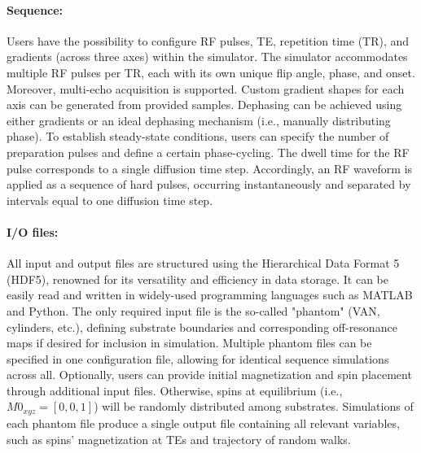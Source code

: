 \paragraph{\textbf{Sequence:}} Users have the possibility to configure RF pulses, TE, repetition time (TR), and gradients (across three axes) within the simulator. The simulator accommodates multiple RF pulses per TR, each with its own unique flip angle, phase, and onset. Moreover, multi-echo acquisition is supported. Custom gradient shapes for each axis can be generated from provided samples. Dephasing can be achieved using either gradients or an ideal dephasing mechanism (i.e., manually distributing phase). To establish steady-state conditions, users can specify the number of preparation pulses and define a certain phase-cycling. The dwell time for the RF pulse corresponds to a single diffusion time step. Accordingly, an RF waveform is applied as a sequence of hard pulses, occurring instantaneously and separated by intervals equal to one diffusion time step.

\paragraph{\textbf{I/O files:}} All input and output files are structured using the Hierarchical Data Format 5 (HDF5), renowned for its versatility and efficiency in data storage. It can be easily read and written in widely-used programming languages such as MATLAB and Python. The only required input file is the so-called "phantom" (VAN, cylinders, etc.), defining substrate boundaries and corresponding off-resonance maps if desired for inclusion in simulation. Multiple phantom files can be specified in one configuration file, allowing for identical sequence simulations across all. Optionally, users can provide initial magnetization and spin placement through additional input files. Otherwise, spins at equilibrium (i.e., \(M0_{xyz} = [0,0,1] \)) will be randomly distributed among substrates. Simulations of each phantom file produce a single output file containing all relevant variables, such as spins' magnetization at TEs and trajectory of random walks. 

